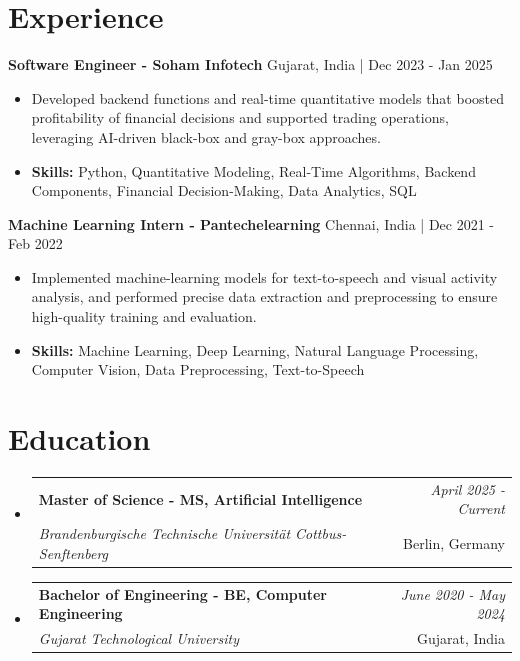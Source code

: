 \documentclass[a4paper,11pt]{article}
\makeatletter
\newcommand{\resumeSubheading}[4]{
\vspace{0.5mm}\item
    \begin{tabular*}{\linewidth}[t]{l@{\extracolsep{\fill}}r}
        \textbf{#1} & \textit{\footnotesize{#4}} \\
        \textit{\footnotesize{#3}} &  \footnotesize{#2}\\
    \end{tabular*}
    \vspace{-2.4mm}
}
\makeatother
\begin{document}
\section{\textbf{Experience}}


\vspace{1mm}
  \textbf{Software Engineer - Soham Infotech} \hfill Gujarat, India | Dec 2023 - Jan 2025
\vspace{-1.5mm} %
\begin{itemize}
  \item Developed backend functions and real-time quantitative models that boosted profitability of financial decisions and supported trading operations, leveraging AI-driven black-box and gray-box approaches.

\vspace{-2mm}
  \item \textbf{Skills:} Python, Quantitative Modeling, Real-Time Algorithms, Backend Components, Financial Decision-Making, Data Analytics, SQL
\end{itemize}

\vspace{1mm}
  \textbf{Machine Learning Intern - Pantechelearning} \hfill Chennai, India | Dec 2021 - Feb 2022
\vspace{-1.5mm} %
\begin{itemize}
  \item Implemented machine-learning models for text-to-speech and visual activity analysis, and performed precise data extraction and preprocessing to ensure high-quality training and evaluation.
\vspace{-2mm}
  \item \textbf{Skills:} Machine Learning, Deep Learning, Natural Language Processing, Computer Vision, Data Preprocessing, Text-to-Speech
\end{itemize}\section{\textbf{Education}}
\vspace{-0.4mm}

\begin{itemize}[leftmargin=0.15in, label={}]
\resumeSubheading
{Master of Science - MS, Artificial Intelligence }{Berlin, Germany}
{Brandenburgische Technische Universität Cottbus-Senftenberg  }{April 2025 - Current}

\vspace{1.0mm} %
\resumeSubheading
{Bachelor of Engineering - BE, Computer Engineering  }{Gujarat, India}
{Gujarat Technological University }{June 2020 - May 2024}

\end{itemize}
\end{document}

